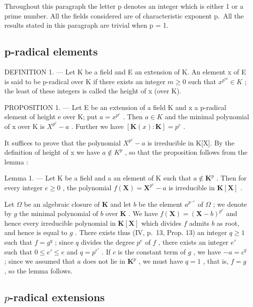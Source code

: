 Throughout this paragraph the letter p denotes an integer which is either 1 or a prime number. All the fields considered are of characteristic exponent p.~All the results stated in this paragraph are trivial when p = 1.

\subsection{p-radical elements}

DEFINITION 1. --- Let K be a field and E an extension of K. An element x of E is said to be p-radical over K if there exists an integer \(m \geqslant 0\) such that \(x^{p^{m}} \in K\) ; the least of these integers is called the height of x (over K).

PROPOSITION 1. --- Let E be an extension of a field K and x a p-radical element of height e over K; put \(a = x^{p^{e}}\) . Then \(a \in K\) and the minimal polynomial of x over K is \(X^{p^{e}} - a\) . Further we have \([\mathbf{K}(x): \mathbf{K}] = p^{e}\) .

It suffices to prove that the polynomial \(X^{p^{e}} - a\) is irreducible in K{[}X{]}. By the definition of height of x we have \(a \notin K^{p}\) , so that the proposition follows from the lemma :

Lemma 1. --- Let K be a field and a an element of K such that \(a \notin \mathbf{K}^p\) . Then for every integer \(e \geqslant 0\) , the polynomial \(f(\mathbf{X}) = \mathbf{X}^{p^e} - a\) is irreducible in \(\mathbf{K}[\mathbf{X}]\) .

Let \(\Omega\) be an algebraic closure of \(\mathbf{K}\) and let \(b\) be the element \(a^{p^{-e}}\) of \(\Omega\) ; we denote by \(g\) the minimal polynomial of \(b\) over \(\mathbf{K}\) . We have \(f(\mathbf{X}) = (\mathbf{X} - b)^{p^e}\) and hence every irreducible polynomial in \(\mathbf{K}[\mathbf{X}]\) which divides \(f\) admits \(b\) as root, and hence is equal to \(g\) . There exists thus (IV, p.~13, Prop. 13) an integer \(q \geqslant 1\) such that \(f = g^q\) ; since \(q\) divides the degree \(p^e\) of \(f\) , there exists an integer \(e'\) such that \(0 \leqslant e' \leqslant e\) and \(q = p^{e'}\) . If \(c\) is the constant term of \(g\) , we have \(-a = c^q\) ; since we assumed that \(a\) does not lie in \(\mathbf{K}^p\) , we must have \(q = 1\) , that is, \(f = g\) , so the lemma follows.

\subsection{\texorpdfstring{\(p\)-radical extensions}{p-radical extensions}}


